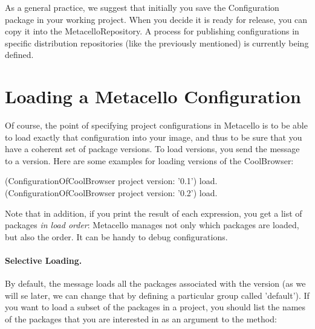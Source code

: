 \documentclass[a4paper,10pt,twoside]{book}
\begin{document}

As a general practice, we suggest that initially you save the Configuration package in your working project. When you decide it is ready for release, you can copy it into the MetacelloRepository. A process for publishing configurations in specific distribution repositories (like the previously mentioned) is currently being defined.



\section{Loading a Metacello Configuration}
Of course, the point of specifying project configurations in Metacello is to be able to load exactly that configuration into your image, and thus to be sure that you have a coherent set of package versions. 
To load versions, you send the message  to a version. Here are some examples for loading versions of the CoolBrowser: 

\begin{code}{}
  (ConfigurationOfCoolBrowser project version: '0.1') load.
  (ConfigurationOfCoolBrowser project version: '0.2') load.
\end{code}

Note that in addition, if you print the result of each expression, you get a list of packages \emph{in load order}: Metacello manages not only which packages are loaded, but also the order. It can be handy to debug configurations.

\paragraph{Selective Loading.} By default, the  message loads all the packages associated with the version (as we will se later, we can change that by defining a particular group called 'default'). If you want to load a subset of the packages in a project, you should list 
the names of the packages that you are interested in as an argument to the  method:
\end{document}
